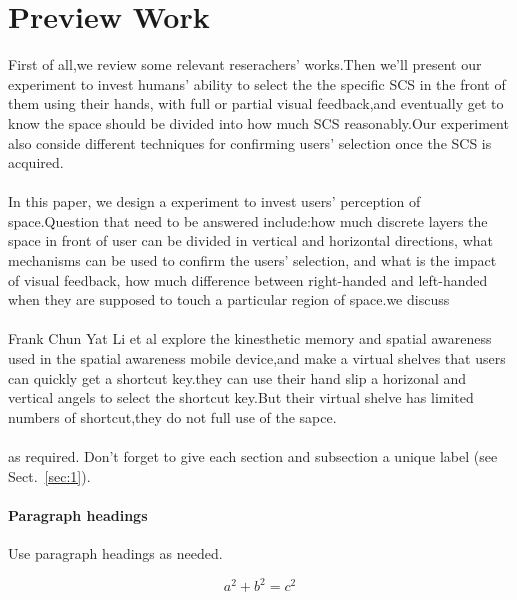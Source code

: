 \section{Preview Work}
First of all,we review some relevant reserachers' works.Then we'll present our experiment to invest humans' ability to select the the specific SCS in the front of them using their hands, with full or partial visual feedback,and eventually get to know the space should be divided into how much SCS reasonably.Our experiment also conside different techniques for confirming users' selection once the SCS is acquired.
\\
\\
In this paper, we design a experiment to invest users' perception of space.Question that need to be answered include:how much discrete layers the space in front of user can be divided in vertical and horizontal directions, what mechanisms can be used to confirm the users' selection, and what is the impact of visual feedback, how much difference between right-handed and left-handed when they are supposed to touch a particular region of space.we discuss
\\
\\
Frank Chun Yat Li et al explore the kinesthetic memory and spatial awareness used in the spatial awareness mobile device,and make a virtual shelves that users can quickly get a shortcut key.they can use their hand slip a horizonal and vertical angels to select the shortcut key.But their virtual shelve has limited numbers of shortcut,they do not full use of the sapce.
\\
\\
as required. Don't forget to give each section
and subsection a unique label (see Sect.~\ref{sec:1}).
\paragraph{Paragraph headings} Use paragraph headings as needed.

\begin{equation}
a^2+b^2=c^2
\end{equation}

